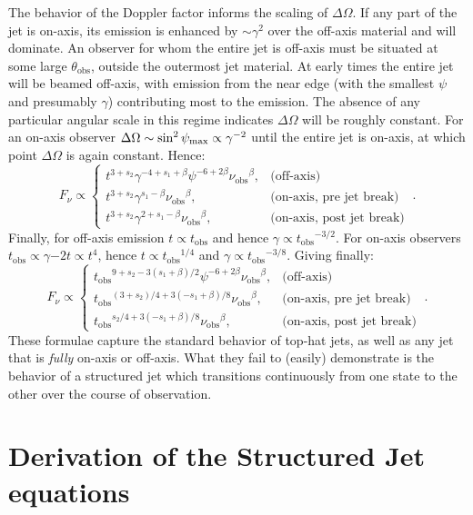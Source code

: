 \documentclass[twocolumn]{aastex62}
\newcommand{\tobs}{\ensuremath{t_{\mathrm{obs}}}}
\newcommand{\nuobs}{\ensuremath{\nu_{\mathrm{obs}}}}
\newcommand{\thobs}{\ensuremath{\theta_{\mathrm{obs}}}}
\begin{document}
The behavior of the Doppler factor informs the scaling of $\Delta \Omega$.  If any part of the jet is on-axis, its emission is enhanced by $\sim \gamma^2$ over the off-axis material and will dominate.  An observer for whom the entire jet is off-axis must be situated at some large $\thobs$, outside the outermost jet material.  At early times the entire jet will be beamed off-axis, with emission from the near edge (with the smallest $\psi$ and presumably $\gamma$) contributing most to the emission.  The absence of any particular angular scale in this regime indicates $\Delta \Omega$ will be roughly constant.  For an on-axis observer $\Delta \Omega \sim \sin^2 \psi_{\rm{max}} \propto \gamma^{-2}$ until the entire jet is on-axis, at which point $\Delta \Omega$ is again constant.  Hence:
\begin{equation}
	F_\nu \propto \left \{ \begin{matrix}
				t^{3+s_2} \gamma^{-4+s_1+\beta} \psi^{-6+2\beta}\nuobs^\beta,  & \text{(off-axis)} \\
				t^{3+s_2} \gamma^{s_1-\beta} \nuobs^\beta, &  \text{(on-axis, pre jet break)} \\
				t^{3+s_2} \gamma^{2+s_1-\beta} \nuobs^\beta, & \text{(on-axis, post jet break)} \end{matrix} \right . \ .
\end{equation}
Finally, for off-axis emission $t \propto \tobs$ and hence $\gamma \propto \tobs^{-3/2}$.  For on-axis observers $\tobs \propto \gamma{-2} t \propto t^4$, hence $t\propto \tobs^{1/4}$ and $\gamma \propto \tobs^{-3/8}$. Giving finally:
\begin{equation}
	F_\nu \propto \left \{ \begin{matrix}
				\tobs^{9+s_2 -3(s_1+\beta)/2} \psi^{-6+2\beta}\nuobs^\beta,  & \text{(off-axis)} \\
				\tobs^{(3+s_2)/4+3(-s_1+\beta)/8} \nuobs^\beta, &\text{(on-axis, pre jet break)} \\
				\tobs^{s_2/4 + 3(-s_1+\beta)/8} \nuobs^\beta, & \text{(on-axis, post jet break)} \end{matrix} \right . \ .
\end{equation}
These formulae capture the standard behavior of top-hat jets, as well as any jet that is \emph{fully} on-axis or off-axis.  What they fail to (easily) demonstrate is the behavior of a structured jet which transitions continuously from one state to the other over the course of observation.

\section{Derivation of the Structured Jet equations}\label{sec:derive2}
\end{document}
